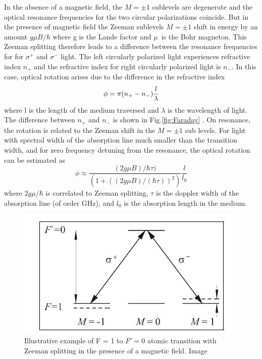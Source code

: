  In the absence of a magnetic field, the $M=\pm 1$ sublevels are
degenerate and the optical resonance frequencies for  the two circular
polarizations coincide. But in the presence of magnetic field the Zeeman sublevels $M=\pm 1$ shift in energy  by an amount $g\mu B/\hbar$ where g is the Lande factor and $\mu$~is the Bohr magneton. This Zeeman splitting therefore leads to a difference between the  resonance frequencies for for $\sigma^+$ and
$\sigma^-$ light. The left circularly polarized light experiences refractive index $n_+$ and the refractive index for right circularly polarized light is $n_-$. In this case, optical rotation arises due to the difference in the refractive index 
\begin{equation}
\label{eq:emc}
\phi = \pi(n_+-n_{-})\frac{l}{\lambda} \\
\end{equation}
where l is the length of the medium traversed and $\lambda$ is the wavelength of light. The difference between $n_+$ and $n_-$ is shown in  Fig.\ref{fig:Faraday} . On resonance, the rotation is related to the Zeeman shift in the $M=\pm 1$ sub levels. For light with spectral
width of the absorption line much smaller than the transition width, and for zero
frequency detuning from the resonance, the optical rotation can be estimated as
\begin{equation}
\phi \approx \frac{(2g\mu B)/ \hbar\tau)}{(1+((2g\mu B)/(\hbar\tau))^2 )}\frac{l}{l_0}
\end{equation}
where $2g\mu/\hbar$ is correlated to Zeeman splitting, $\tau$ is the doppler width of the
absorption line (of order GHz), and $l_0$ is the absorption length in the medium. 
\begin{figure}[h]
\centering
\includegraphics[width=0.75\linewidth]{figures/optical_rotation}
\caption{Illustrative example of F = 1 to $F' = 0$ atomic transition with Zeeman
splitting in the presence of a magnetic field. Image\cite{Budker2002JU2}\label{fig:Zeemansplitting}}
\end{figure}
